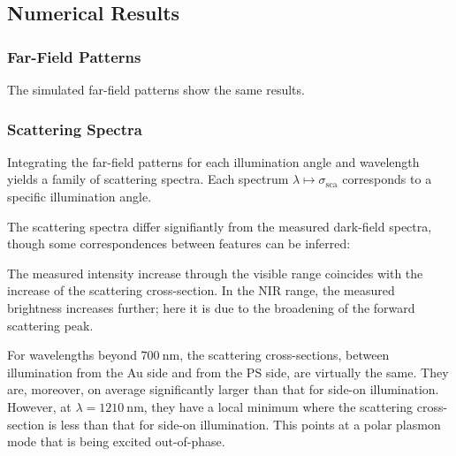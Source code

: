 \documentclass[10pt]{article}
\begin{document}
\subsection*{Numerical Results}


\subsubsection*{Far-Field Patterns}

The simulated far-field patterns show the same results. 

\subsubsection*{Scattering Spectra}

Integrating the far-field patterns for each illumination angle and wavelength yields a family of scattering spectra. 
Each spectrum $\lambda\mapsto\sigma_\mathrm{sca}$ corresponds to a specific illumination angle. 

The scattering spectra differ signifiantly from the measured dark-field spectra, though some correspondences between features can be inferred: 

The measured intensity increase through the visible range coincides with the increase of the scattering cross-section. 
In the NIR range, the measured brightness increases further; here it is due to the broadening of the forward scattering peak. 

For wavelengths beyond $\SI{700}{\nano\meter}$, the scattering cross-sections, between illumination from the Au side and from the PS side, are virtually the same. 
They are, moreover, on average significantly larger than that for side-on illumination. 
However, at $\lambda=\SI{1210}{\nano\meter}$, they have a local minimum where the scattering cross-section is less than that for side-on illumination. 
This points at a polar plasmon mode that is being excited out-of-phase. 
\end{document}
